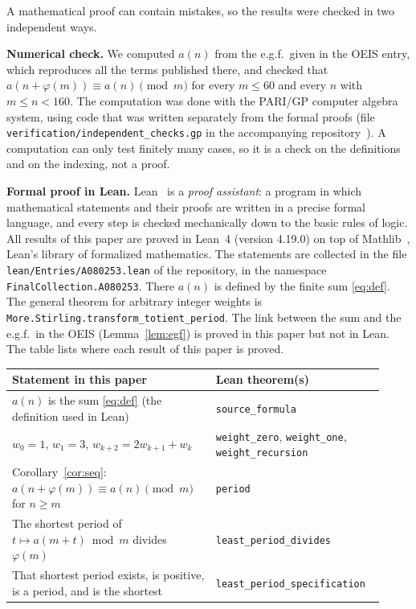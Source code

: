 \documentclass[11pt,a4paper]{article}
\theoremstyle{definition}
\theoremstyle{remark}
\newcommand{\para}[1]{\par\medskip\noindent\textbf{#1}\enspace}
\begin{document}
A mathematical proof can contain mistakes, so the results were checked in two independent ways.

\para{Numerical check.}
We computed $a(n)$ from the e.g.f.\ given in the OEIS entry, which reproduces all the terms published there, and
checked that $a(n+\varphi(m))\equiv a(n)\pmod m$ for every $m\le60$ and every $n$ with $m\le n<160$.
The computation was done with the PARI/GP computer algebra system, using code that was written separately from the
formal proofs (file \texttt{verification/independent\_checks.gp} in the accompanying repository~\cite{repo}).
A computation can only test finitely many cases, so it is a check on the definitions and on the indexing, not a proof.

\para{Formal proof in Lean.}
Lean~\cite{lean} is a \emph{proof assistant}: a program in which mathematical statements and their proofs are written
in a precise formal language, and every step is checked mechanically down to the basic rules of logic. All results of
this paper are proved in Lean~4 (version 4.19.0) on top of Mathlib~\cite{mathlib}, Lean's library of formalized
mathematics. The statements are collected in the file \texttt{lean/Entries/A080253.lean} of the repository,
in the namespace \texttt{FinalCollection.A080253}. There $a(n)$ is defined by the finite sum \eqref{eq:def}. The general theorem for arbitrary integer weights is \texttt{More.Stirling.transform\_totient\_period}. The link between the sum and the e.g.f.\ in the OEIS (Lemma~\ref{lem:egf}) is proved in this paper but not in Lean.
The table lists where each result of this paper is proved.
\begin{center}\small\renewcommand{\arraystretch}{1.25}
\begin{tabular}{>{\raggedright\arraybackslash}p{0.52\linewidth}>{\raggedright\arraybackslash}p{0.4\linewidth}}
\toprule
Statement in this paper & Lean theorem(s)\\
\midrule
$a(n)$ is the sum \eqref{eq:def} (the definition used in Lean) & \texttt{source\_\allowbreak{}formula} \\
$w_0=1$, $w_1=3$, $w_{k+2}=2w_{k+1}+w_k$ & \texttt{weight\_\allowbreak{}zero}, \texttt{weight\_\allowbreak{}one}, \texttt{weight\_\allowbreak{}recursion} \\
Corollary~\ref{cor:seq}: $a(n+\varphi(m))\equiv a(n)\pmod m$ for $n\ge m$ & \texttt{period} \\
The shortest period of $t\mapsto a(m+t)\bmod m$ divides $\varphi(m)$ & \texttt{least\_\allowbreak{}period\_\allowbreak{}divides} \\
That shortest period exists, is positive, is a period, and is the shortest & \texttt{least\_\allowbreak{}period\_\allowbreak{}specification} \\
\bottomrule
\end{tabular}
\end{center}
\end{document}
